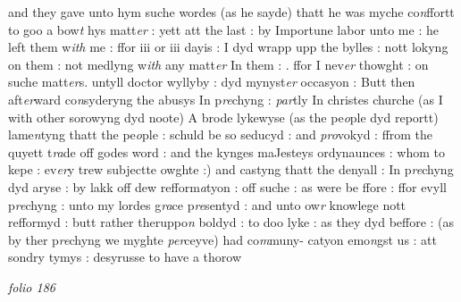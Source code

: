 \documentclass[12pt, a4paper]{book}
\begin{document}
            			 and they gave
            			unto hym suche wordes (as he sayde) thatt he was myche co\textit{n}ffortt
            			to goo a bow\textit{t} hys matt\textit{er} : yett att the last : by
            			Importune labor unto me : he left them w\textit{ith} me : ffor iii or iii
            			dayis : I dyd wrapp upp the bylles : nott lokyng on them : not medlyng
            			w\textit{ith} any matt\textit{er} In them : . ffor I
            			nev\textit{er} thowght : on suche matt\textit{er}s. untyll  doctor
            					wyllyby : dyd
            			mynyst\textit{er} occasyon : Butt then aft\textit{er}ward
            			co\textit{n}syderyng the abusys In p\textit{re}chyng :
            			\textit{par}tly In christes churche (as I with other sorowyng dyd
            			noote) A brode lykewyse (as the pe\textit{o}ple dyd reportt)
            			lame\textit{n}tyng thatt the pe\textit{o}ple : schuld be so
            			seducyd : and \textit{pro}vokyd : ffrom the quyett t\textit{ra}de
            			off godes word : and the kynges maJesteys ordynaunces : whom to kepe :
            			ev\textit{er}y trew subjectte owghte :) and castyng thatt the denyall
            			: In p\textit{re}chyng dyd aryse : by lakk off dew
            			refform\textit{a}tyon : off suche : as were be ffore : ffor evyll
            			p\textit{re}chyng : unto my lordes g\textit{ra}ce
            			p\textit{re}sentyd : and unto ow\textit{r} knowlege nott
            			refformyd : butt rather theruppo\textit{n} boldyd : to doo lyke : as they
            			dyd beffore : (as by ther p\textit{re}chyng we myghte
            			\textit{per}ceyve) had co\textit{m}muny- catyon
            					emo\textit{n}gst us : att sondry tymys : desyrusse to have a thorow
            			
            	
\dotfill
					

\textit{folio 186}
            		
\end{document}
